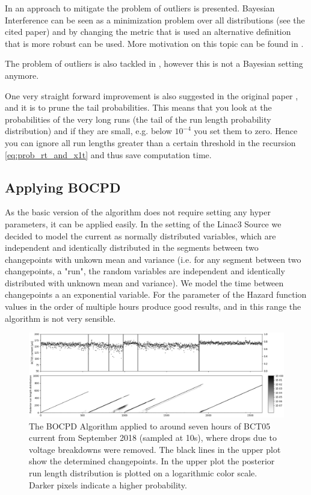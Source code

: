 \documentclass[12pt,a4paper]{article}
\begin{document}
In \cite{Knoblauch:DoublyRobustBayesian} an approach to mitigate the problem of outliers is presented. Bayesian Interference can be seen as a minimization problem over all distributions (see the cited paper) and by changing the metric that is used an alternative definition that is more robust can be used. More motivation on this topic can be found in \cite{Knoblauch:GeneralizedVariationalInference}.

The problem of outliers is also tackled in \cite{Fearnhead:ChangepointDetectionPresence}, however this is not a Bayesian setting anymore.

One very straight forward improvement is also suggested in the original paper \cite{Adams:BayesianOnlineChangepoint}, and it is to prune the tail probabilities. This means that you look at the probabilities of the very long runs (the tail of the run length probability distribution) and if they are small, e.g. below $10^{-4}$ you set them to zero. Hence you can ignore all run lengths greater than a certain threshold in the recursion \eqref{eq:prob_rt_and_x1t} and thus save computation time.

\subsection{Applying BOCPD}
As the basic version of the algorithm does not require setting any hyper parameters, it can be applied easily. In the setting of the Linac3 Source we decided to model the current as normally distributed variables, which are independent and identically distributed in the segments between two changepoints with unkown mean and variance (i.e. for any segment between two changepoints, a "run", the random variables are independent and identically distributed with unknown mean and variance). We model the time between changepoints a an exponential variable. For the parameter of the Hazard function values in the order of multiple hours produce good results, and in this range the algorithm is not very sensible.

\begin{figure}
	\centering
	\includegraphics{images/bocd_example.png}
	\caption{The BOCPD Algorithm applied to around seven hours of BCT05 current from September 2018 (sampled at 10s), where drops due to voltage breakdowns were removed. The black lines in the upper plot show the determined changepoints. In the upper plot the posterior run length distribution is plotted on a logarithmic color scale. Darker pixels indicate a higher probability.}
	\label{fig:bocd_example}
\end{figure}
\end{document}
